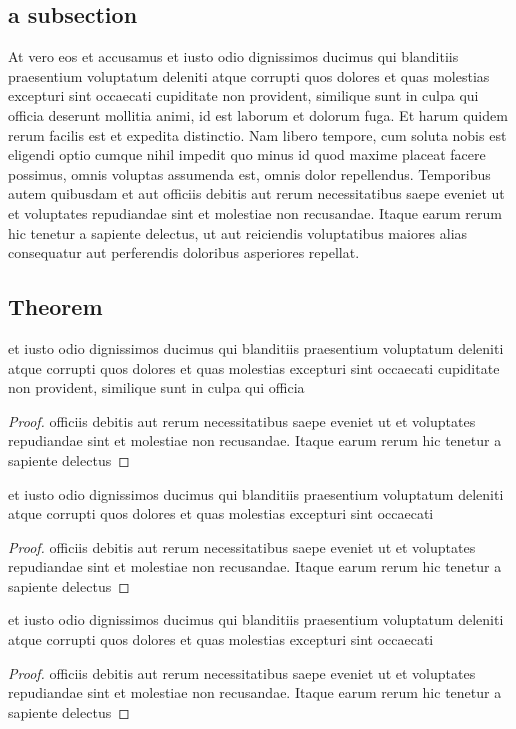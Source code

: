 \documentclass[12pt, twoside]{report}
\begin{document}
\subsection{a subsection}
At vero eos et accusamus \cite{cite_ex} et iusto odio dignissimos ducimus qui blanditiis praesentium voluptatum deleniti atque corrupti quos dolores et quas molestias excepturi sint occaecati
cupiditate non provident, similique sunt in culpa qui officia deserunt mollitia animi, id est laborum et dolorum fuga. Et harum quidem rerum facilis est et expedita distinctio.
Nam libero tempore, cum soluta nobis est eligendi optio cumque nihil impedit quo minus id quod maxime placeat facere possimus, omnis voluptas assumenda est, omnis dolor repellendus.
Temporibus autem quibusdam et aut officiis debitis aut rerum necessitatibus saepe eveniet ut et voluptates repudiandae sint et molestiae non recusandae.
Itaque earum rerum hic tenetur a sapiente delectus, ut aut reiciendis voluptatibus maiores alias consequatur aut perferendis doloribus asperiores repellat.
\subsection{Theorem}

\begin{theorem}
	et iusto odio dignissimos ducimus qui blanditiis praesentium voluptatum deleniti atque corrupti quos dolores et quas molestias excepturi sint occaecati
	cupiditate non provident, similique sunt in culpa qui officia
\end{theorem}
\begin{proof}
	officiis debitis aut rerum necessitatibus saepe eveniet ut et voluptates repudiandae sint et molestiae non recusandae.
	Itaque earum rerum hic tenetur a sapiente delectus
\end{proof}

\begin{definition}
	et iusto odio dignissimos ducimus qui blanditiis praesentium voluptatum deleniti atque corrupti quos dolores et quas molestias excepturi sint occaecati
\end{definition}
\begin{proof}
	officiis debitis aut rerum necessitatibus saepe eveniet ut et voluptates repudiandae sint et molestiae non recusandae.
	Itaque earum rerum hic tenetur a sapiente delectus
\end{proof}

\begin{lemma}
	et iusto odio dignissimos ducimus qui blanditiis praesentium voluptatum deleniti atque corrupti quos dolores et quas molestias excepturi sint occaecati
\end{lemma}
\begin{proof}
	officiis debitis aut rerum necessitatibus saepe eveniet ut et voluptates repudiandae sint et molestiae non recusandae.
	Itaque earum rerum hic tenetur a sapiente delectus
\end{proof}
\end{document}
